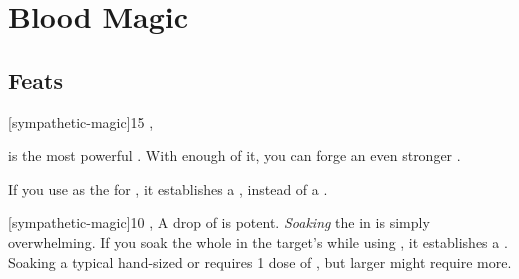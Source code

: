 \chapter{Blood Magic}

\section{Feats}

[sympathetic-magic]{15}{
	,
}{
	 is the most powerful .
	With enough of it, you can forge an even stronger {\symlink}.
	
	If you use  as the  for , it establishes a {\standardsymlink}, instead of a {\weaksymlink}.
}

[sympathetic-magic]{10}{
	,
}{
	A drop of  is potent.
	\emph{Soaking} the {\symbol} in  is simply overwhelming.
	If you soak the whole {\symbol} in the target's  while using , it establishes a {\strongsymlink}.
	Soaking a typical hand-sized  or  requires 1 dose of , but larger {\symbols} might require more.
}
